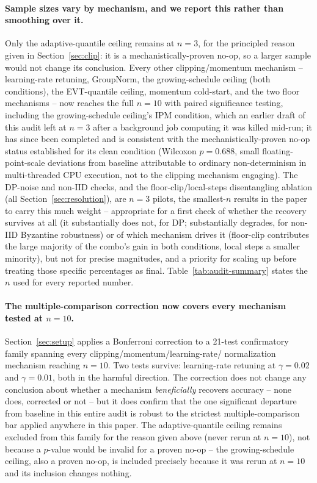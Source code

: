 \documentclass{article}
\begin{document}
\paragraph{Sample sizes vary by mechanism, and we report this rather than
smoothing over it.} Only the adaptive-quantile ceiling remains at $n{=}3$, for
the principled reason given in Section~\ref{sec:clip}: it is a
mechanistically-proven no-op, so a larger sample would not change its
conclusion. Every other clipping/momentum mechanism -- learning-rate retuning,
GroupNorm, the growing-schedule ceiling (both conditions), the EVT-quantile
ceiling, momentum cold-start, and the two floor mechanisms -- now reaches the
full $n{=}10$ with paired significance testing, including the growing-schedule
ceiling's IPM condition, which an earlier draft of this audit left at $n{=}3$
after a background job computing it was killed mid-run; it has since been
completed and is consistent with the mechanistically-proven no-op status
established for its clean condition (Wilcoxon $p{=}0.688$, small
floating-point-scale deviations from baseline attributable to ordinary
non-determinism in multi-threaded CPU execution, not to the clipping mechanism
engaging). The DP-noise and non-IID checks, and the floor-clip/local-steps
disentangling ablation (all Section~\ref{sec:resolution}), are $n{=}3$ pilots,
the smallest-$n$ results in the paper to carry this much weight -- appropriate
for a first check of whether the recovery survives at all (it substantially
does not, for DP; substantially degrades, for non-IID Byzantine robustness) or
of which mechanism drives it (floor-clip contributes the large majority of the
combo's gain in both conditions, local steps a smaller minority), but not for
precise magnitudes, and a priority for scaling up before treating those
specific percentages as final. Table~\ref{tab:audit-summary} states the $n$
used for every reported number.

\paragraph{The multiple-comparison correction now covers every mechanism
tested at $n{=}10$.} Section~\ref{sec:setup} applies a Bonferroni correction to
a 21-test confirmatory family spanning every clipping/momentum/learning-rate/
normalization mechanism reaching $n{=}10$. Two tests survive: learning-rate
retuning at $\gamma{=}0.02$ and $\gamma{=}0.01$, both in the harmful direction.
The correction does not change any conclusion about whether a mechanism
\emph{beneficially} recovers accuracy -- none does, corrected or not -- but it
does confirm that the one significant departure from baseline in this entire
audit is robust to the strictest multiple-comparison bar applied anywhere in
this paper. The adaptive-quantile ceiling remains excluded from this family for
the reason given above (never rerun at $n{=}10$), not because a $p$-value would
be invalid for a proven no-op -- the growing-schedule ceiling, also a proven
no-op, is included precisely because it was rerun at $n{=}10$ and its
inclusion changes nothing.
\end{document}

